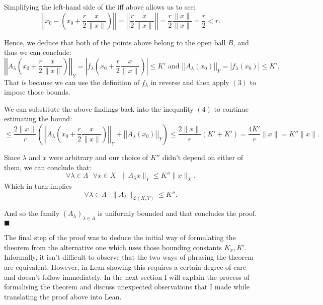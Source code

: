 \documentclass[11pt]{article}
\newcommand\sep{\text{ }}
\begin{document}
Simplifying the left-hand side of the iff above allows us to see:
\[
\left|\left|x_0 - \left(x_0 + \frac{r}{2}\frac{x}{\|x\|}   \right) \right|\right| =
\left|\left| \frac{r}{2}\frac{x}{\|x\|}\right|\right| = \frac{r}{2} \frac{\|x\|}{\|x\|} = \frac{r}{2}  < r
.\]

Hence, we deduce that both of the points above belong to the open ball $B$, and
thus we can conclude:
\[
  \left|\left| A_\lambda\left( x_0 + \frac{r}{2}\frac{x}{\|x\|} \right)\right|\right|_Y = \left| f_\lambda\left( x_0 + \frac{r}{2}\frac{x}{\|x\|} \right)\right| \le K' \text{ and }
\left|\left| A_\lambda(x_0)  \right|\right|_Y = \left| f_\lambda(x_0)  \right| \le K'
.\]
That is because we can use the definition of $f_\lambda$ in reverse and then apply
 $(3)$ to impose those bounds.

 We can substitute the above findings back into the inequality $(4)$ to continue
 estimating the bound:
 \[
 \le \frac{2\|x\|}{r} \left( \left|\left| A_\lambda\left( x_0 + \frac{r}{2}\frac{x}{\|x\|} \right)
 \right|\right|_Y + \left|\left| A_\lambda(x_0)  \right|\right|_Y \right)
 \le \frac{2\|x\|}{r} \left( K' + K'\right) = \frac{4K'}{r}\|x\| = K''\|x\|
 .\]

 Since $\lambda$ and  $x$ were arbitrary and our choice of $K''$ didn't depend on either
 of them, we can conclude that:
\[
   \forall \lambda \in \Lambda \sep \forall x \in X \sep \|A_\lambda x\|_Y \le K'' \|x\|_X
.\]
Which in turn implies
\[
\forall \lambda \in \Lambda \sep \|A_\lambda\|_{\mathcal{L}\left( X, Y \right)}  \le K''.\]

And so the family $\left( A_\lambda \right)_{\lambda \in \Lambda} $ is uniformly
bounded and that concludes the proof. \hfill $\blacksquare$

The final step of the proof was to deduce the initial way of formulating the theorem
from the alternative one which uses those bounding constants $K_x, K'$. Informally,
it isn't difficult to observe that the two ways of phrasing the theorem are equivalent.
However, in Lean showing this requires a certain degree of care and doesn't follow
immediately. In the next section I will explain the process of formalising the
theorem and discuss unexpected observations that I made while translating the proof
above into Lean.
\end{document}

